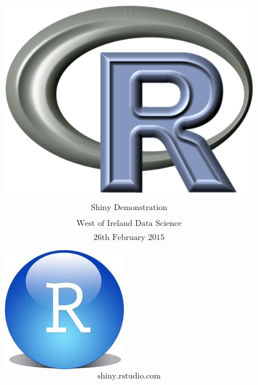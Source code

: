 \documentclass{beamer}
\begin{document}
\begin{frame}
\begin{figure}
\vspace{1cm}
\centering
\includegraphics[width=0.37\linewidth]{./Rlogo}

\end{figure}
\LARGE
\[ \mbox{Shiny Demonstration}  \]

\[ \mbox{West of Ireland Data Science}  \]
\Large


\[ \mbox{26th February 2015}  \]
\end{frame}
\begin{frame}
\begin{figure}
\Large
\centering
\includegraphics[width=0.55\linewidth]{./Rstudio}
\[ \mbox{shiny.rstudio.com}  \]
\end{figure}

\end{frame}
\end{document}
